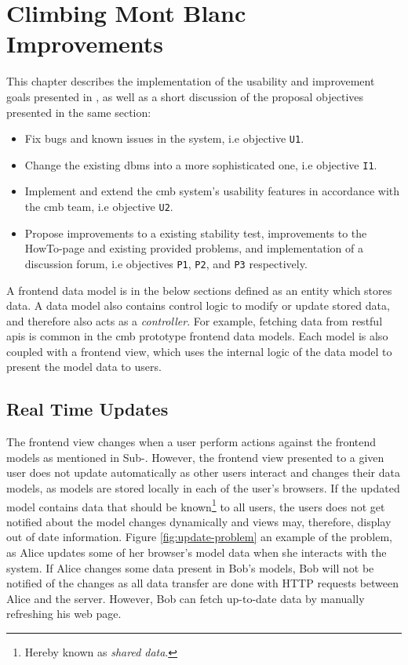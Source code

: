 \chapter{Climbing Mont Blanc Improvements}
\label{ch:improvements}
This chapter describes the implementation of the usability and improvement goals presented in , as well as a short discussion of the proposal objectives presented in the same section:
\begin{itemize}
    \item Fix bugs and known issues in the system, i.e objective \texttt{U1}.
    \item Change the existing \gls{dbms} into a more sophisticated one, i.e objective \texttt{I1}.
    \item Implement and extend the \gls{cmb} system's usability features in accordance with the \gls{cmb} team, i.e objective \texttt{U2}.
    \item Propose improvements to a existing stability test, improvements to the HowTo-page and existing provided problems, and implementation of a discussion forum, i.e objectives \texttt{P1}, \texttt{P2}, and \texttt{P3} respectively.
\end{itemize}
A frontend data model is in the below sections defined as an entity which stores data. A data model also contains control logic to modify or update stored data, and therefore also acts as a \textit{controller}. For example, fetching data from \gls{rest}ful \glspl{api} is common in the \gls{cmb} prototype frontend data models. Each model is also coupled with a frontend view, which uses the internal logic of the data model to present the model data to users.
\clearpage
\section{Real Time Updates}
\label{sec:real-time}
The frontend view changes when a user perform actions against the frontend models as mentioned in Sub-. However, the frontend view presented to a given user does not update automatically as other users interact and changes their data models, as models are stored locally in each of the user's browsers. If the updated model contains data that should be known\footnote{Hereby known as \textit{shared data}.} to all users, the users does not get notified about the model changes dynamically and views may, therefore, display out of date information. Figure \ref{fig:update-problem} an example of the problem, as Alice updates some of her browser’s model data when she interacts with the system. If Alice changes some data present in Bob’s models, Bob will not be notified of the changes as all data transfer are done with HTTP requests between Alice and the server. However, Bob can fetch up-to-date data by manually refreshing his web page. \\

